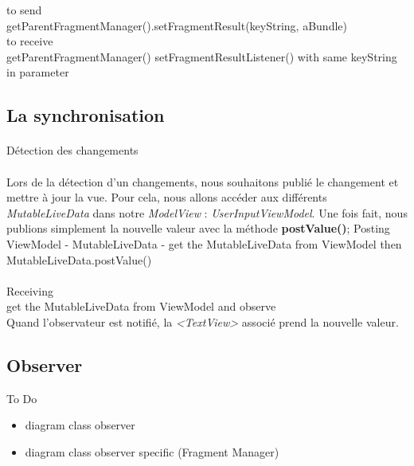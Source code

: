 \documentclass[a4paper]{article}
\begin{document}
\begin{multicols}{2}
                    to send
                \\
                getParentFragmentManager().setFragmentResult(keyString, aBundle)
                \\
                to receive
                \\
                getParentFragmentManager() setFragmentResultListener() with same keyString in parameter 
            \subsection{La synchronisation}
                \paragraph{}
                    Détection des changements
                \paragraph{}
                    Lors de la détection d'un changements, nous souhaitons publié le changement et mettre à jour la vue. Pour cela, nous allons accéder aux différents \emph{MutableLiveData} dans notre \emph{ModelView} : \emph{UserInputViewModel}. Une fois fait, nous publions simplement la nouvelle valeur avec la méthode \textbf{postValue()};
                    Posting
                    \\
                    ViewModel - MutableLiveData - get the MutableLiveData from ViewModel then MutableLiveData.postValue()
                \paragraph{}
                    Receiving
                    \\
                    get the MutableLiveData from ViewModel and observe
                    \\
                    Quand l'observateur est notifié, la \emph{<TextView>} associé prend la nouvelle valeur.
            \subsection{Observer}
                To Do
                \begin{itemize}
                    \item diagram class observer
                    \item diagram class observer specific (Fragment Manager)
                \end{itemize}

\end{multicols}
\end{document}
